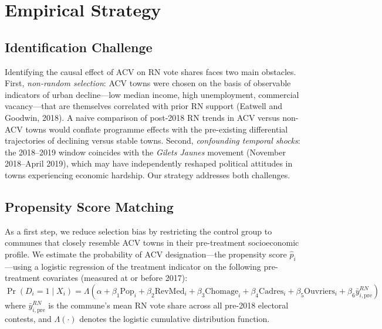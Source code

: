 
\section{Empirical Strategy}
\label{sec:strategy}

\subsection{Identification Challenge}

Identifying the causal effect of ACV on RN vote shares faces two main obstacles. First, \textit{non-random selection}: ACV towns were chosen on the basis of observable indicators of urban decline---low median income, high unemployment, commercial vacancy---that are themselves correlated with prior RN support (Eatwell and Goodwin, 2018). A naive comparison of post-2018 RN trends in ACV versus non-ACV towns would conflate programme effects with the pre-existing differential trajectories of declining versus stable towns. Second, \textit{confounding temporal shocks}: the 2018--2019 window coincides with the \textit{Gilets Jaunes} movement (November 2018--April 2019), which may have independently reshaped political attitudes in towns experiencing economic hardship. Our strategy addresses both challenges.

\subsection{Propensity Score Matching}

As a first step, we reduce selection bias by restricting the control group to communes that closely resemble ACV towns in their pre-treatment socioeconomic profile. We estimate the probability of ACV designation---the propensity score $\hat{p}_i$---using a logistic regression of the treatment indicator on the following pre-treatment covariates (measured at or before 2017):
\begin{equation}
  \Pr(D_i = 1 \mid X_i) = \Lambda\left( \alpha + \beta_1 \text{Pop}_i + \beta_2 \text{RevMed}_i + \beta_3 \text{Chomage}_i + \beta_4 \text{Cadres}_i + \beta_5 \text{Ouvriers}_i + \beta_6 \bar{y}^{RN}_{i,\text{pre}} \right)
\end{equation}
where $\bar{y}^{RN}_{i,\text{pre}}$ is the commune's mean RN vote share across all pre-2018 electoral contests, and $\Lambda(\cdot)$ denotes the logistic cumulative distribution function.

